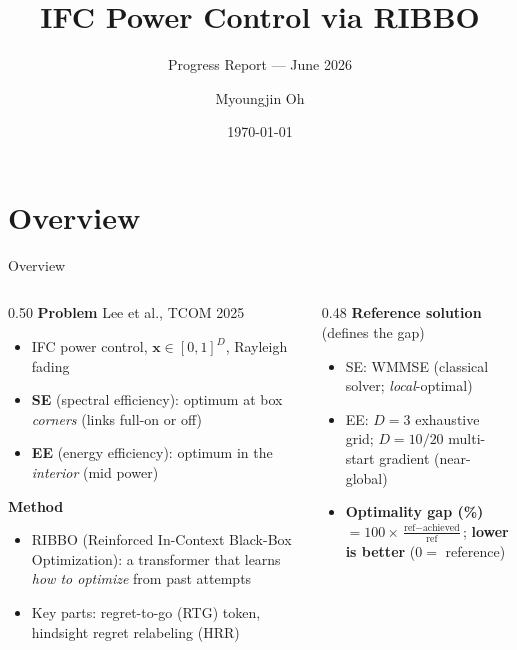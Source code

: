 \documentclass[10pt,aspectratio=169]{beamer}
\title{IFC Power Control via RIBBO}
\subtitle{Progress Report --- June 2026}
\author{Myoungjin Oh}
\date{\today}
\newenvironment{tightitemize}{%
    \begin{itemize}
        \setlength{\itemsep}{2pt}
        \setlength{\parskip}{0pt}
        \setlength{\parsep}{0pt}
}{%
    \end{itemize}
}
\begin{document}
\begin{frame}[plain]
    \titlepage
\end{frame}

\section{Overview}

\begin{frame}{Overview}
    \small
    \begin{columns}[T,onlytextwidth]
        \begin{column}{0.50\textwidth}
            \textbf{Problem} \hfill {\scriptsize Lee et al., TCOM 2025}
            \begin{tightitemize}
                \item IFC power control, $\mathbf{x}\in[0,1]^D$, Rayleigh fading
                \item \textbf{SE} (spectral efficiency): optimum at box \emph{corners} (links full-on or off)
                \item \textbf{EE} (energy efficiency): optimum in the \emph{interior} (mid power)
            \end{tightitemize}

            \vspace{0.5em}
            \textbf{Method}
            \begin{tightitemize}
                \item RIBBO (Reinforced In-Context Black-Box Optimization): a transformer that learns \emph{how to optimize} from past attempts
                \item Key parts: regret-to-go (RTG) token, hindsight regret relabeling (HRR)
            \end{tightitemize}
        \end{column}
        \begin{column}{0.48\textwidth}
            \textbf{Reference solution} {\scriptsize(defines the gap)}
            \begin{tightitemize}
                \item SE: WMMSE (classical solver; \emph{local}-optimal)
                \item EE: $D{=}3$ exhaustive grid; $D{=}10/20$ multi-start gradient (near-global)
                \item \textbf{Optimality gap (\%)} $=100\times\frac{\text{ref}-\text{achieved}}{\text{ref}}$; \textbf{lower is better} ($0=$ reference)
            \end{tightitemize}


\end{column}
\end{columns}
\end{frame}
\end{document}
